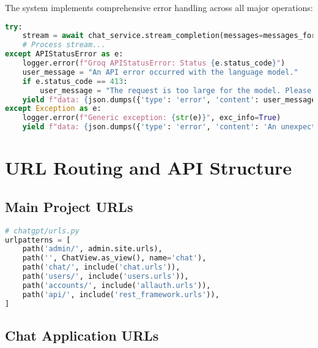 \documentclass[12pt,a4paper]{article}
\begin{document}
The system implements comprehensive error handling across all major operations:

\begin{lstlisting}[language=Python, caption=Error Handling Implementation]
try:
    stream = await chat_service.stream_completion(messages=messages_for_llm)
    # Process stream...
except APIStatusError as e:
    logger.error(f"Groq APIStatusError: Status {e.status_code}")
    user_message = "An API error occurred with the language model."
    if e.status_code == 413:
        user_message = "The request is too large for the model. Please try reducing your message size."
    yield f"data: {json.dumps({'type': 'error', 'content': user_message})}\n\n"
except Exception as e:
    logger.error(f"Generic exception: {str(e)}", exc_info=True)
    yield f"data: {json.dumps({'type': 'error', 'content': 'An unexpected error occurred.'})}\n\n"
\end{lstlisting}

\section{URL Routing and API Structure}

\subsection{Main Project URLs}

\begin{lstlisting}[language=Python, caption=Main URL Configuration]
# chatgpt/urls.py
urlpatterns = [
    path('admin/', admin.site.urls),
    path('', ChatView.as_view(), name='chat'),
    path('chat/', include('chat.urls')),
    path('users/', include('users.urls')),
    path('accounts/', include('allauth.urls')),
    path('api/', include('rest_framework.urls')),
]
\end{lstlisting}

\subsection{Chat Application URLs}
\end{document}
